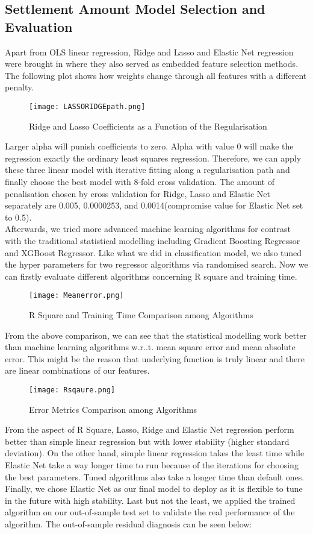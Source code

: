 \subsection{Settlement Amount Model Selection and Evaluation}
Apart from OLS linear regression, Ridge and Lasso and Elastic Net regression were brought in where they also served as embedded feature selection methods. The following plot shows how weights change through all features with a different penalty.
\begin{figure}[H]
  \centering
  \texttt{[image: LASSORIDGEpath.png]}
  \caption{Ridge and Lasso Coefficients as a Function of the Regularisation}
\end{figure}
Larger alpha will punish coefficients to zero. Alpha with value 0 will make the regression exactly the ordinary least squares regression. Therefore, we can apply these three linear model with iterative fitting along a regularisation path and finally choose the best model with 8-fold cross validation. The amount of penalisation chosen by cross validation for Ridge, Lasso and Elastic Net separately are 0.005, 0.0000253, and 0.0014(compromise value for Elastic Net set to 0.5). \\
\indent Afterwards, we tried more advanced machine learning algorithms for contrast with the traditional statistical modelling including Gradient Boosting Regressor and XGBoost Regressor. Like what we did in classification model, we also tuned the hyper parameters for two regressor algorithms via randomised search. Now we can firstly evaluate different algorithms concerning R square and training time.
\begin{figure}[H]
  \centering
  \texttt{[image: Meanerror.png]}
  \caption{R Square and Training Time Comparison among Algorithms}
\end{figure}
From the above comparison, we can see that the statistical modelling work better than machine learning algorithms w.r..t. mean square error and mean absolute error. This might be the reason that underlying function is truly linear and there are linear combinations of our features. 
\begin{figure}[H]
  \centering
  \texttt{[image: Rsqaure.png]}
  \caption{Error Metrics Comparison among Algorithms}
\end{figure}
From the aspect of R Square, Lasso, Ridge and Elastic Net regression perform better than simple linear regression but with lower stability (higher standard deviation). On the other hand, simple linear regression takes the least time while Elastic Net take a way longer time to run because of the iterations for choosing the best parameters. Tuned algorithms also take a longer time than default ones. Finally, we chose Elastic Net as our final model to deploy as it is flexible to tune in the future with high stability. Last but not the least, we applied the trained algorithm on our out-of-sample test set to validate the real performance of the algorithm. The out-of-sample residual diagnosis can be seen below:
